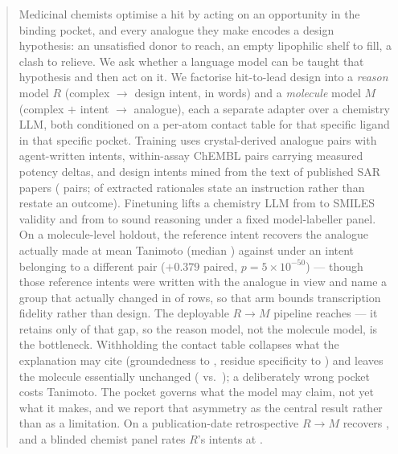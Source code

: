 \begin{abstract}
Medicinal chemists optimise a hit by acting on an opportunity in the binding pocket, and every
analogue they make encodes a design hypothesis: an unsatisfied donor to reach, an empty lipophilic
shelf to fill, a clash to relieve. We ask whether a language model can be taught that hypothesis
and then act on it. We factorise hit-to-lead design into a \emph{reason} model $R$ (complex
$\rightarrow$ design intent, in words) and a \emph{molecule} model $M$ (complex $+$ intent
$\rightarrow$ analogue), each a separate adapter over a chemistry LLM, both conditioned on a
per-atom contact table for that specific ligand in that specific pocket. Training uses
crystal-derived analogue pairs with agent-written intents, within-assay ChEMBL pairs carrying
measured potency deltas, and design intents mined from the text of  published SAR papers
( pairs;  of extracted rationales state an instruction rather than restate an
outcome). Finetuning lifts a chemistry LLM from  to  SMILES validity and from
 to  sound reasoning under a fixed model-labeller panel. On a molecule-level
holdout, the reference intent recovers the analogue actually made at  mean
Tanimoto (median ) against  under an intent belonging to a different pair
($+0.379$ paired, $p=5\times10^{-50}$) --- though those reference intents were written with the
analogue in view and name a group that actually changed in  of rows, so that arm bounds
transcription fidelity rather than design. The deployable $R\!\rightarrow\!M$ pipeline reaches
 --- it retains only  of that gap, so the reason model, not the molecule model,
is the bottleneck. Withholding the contact table collapses what the explanation may cite
(groundedness  to , residue specificity  to ) and leaves the
molecule essentially unchanged ( vs.\ ); a deliberately wrong pocket costs
 Tanimoto. The pocket governs what the model may claim, not yet what it makes, and we
report that asymmetry as the central result rather than as a limitation. On a publication-date
retrospective $R\!\rightarrow\!M$ recovers , and a blinded chemist
panel rates $R$'s intents at .
\end{abstract}
